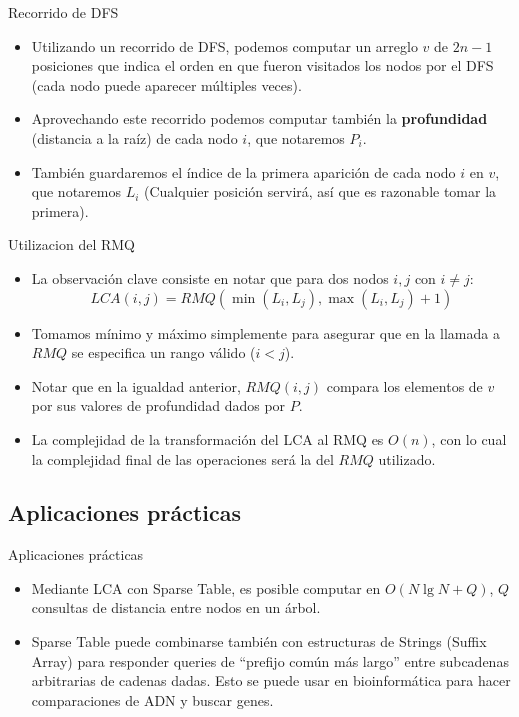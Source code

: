 \documentclass{beamer}
\DeclareMathOperator*{\mimin}{min}
\DeclareMathOperator*{\mimax}{max}
\begin{document}
\begin{frame}{Recorrido de DFS}
\begin{itemize}
   \item Utilizando un recorrido de DFS, podemos computar un arreglo $v$ de $2n - 1$ posiciones que indica el orden en que
   fueron visitados los nodos por el DFS (cada nodo puede aparecer múltiples veces).
   \item Aprovechando este recorrido podemos computar también la \textbf{profundidad} (distancia a la raíz) de cada nodo $i$, que notaremos $P_i$.
   \item También guardaremos el índice de la primera aparición de cada nodo $i$ en $v$, que notaremos $L_i$ (Cualquier posición servirá, así
   que es razonable tomar la primera).
\end{itemize}
\end{frame}

\begin{frame}{Utilizacion del RMQ}
\begin{itemize}
   \item La observación clave consiste en notar que para dos nodos $i,j$ con $i \neq j$:
   $$ LCA(i,j) = RMQ(\mimin(L_i,L_j),\mimax(L_i,L_j)+1) $$
   \item Tomamos mínimo y máximo simplemente para asegurar que en la llamada a $RMQ$ se especifica un rango válido ($i < j$).
   \item Notar que en la igualdad anterior, $RMQ(i,j)$ compara los elementos de $v$ por sus valores de profundidad dados por $P$.
   \item La complejidad de la transformación del LCA al RMQ es $O(n)$, con lo cual la complejidad final de las operaciones
   será la del $RMQ$ utilizado.
\end{itemize}
\end{frame}

\subsection{Aplicaciones prácticas} %

\begin{frame}{Aplicaciones prácticas}
\begin{itemize}
   \item Mediante LCA con Sparse Table, es posible computar en $O(N \lg N + Q)$, $Q$ consultas de distancia entre nodos en un árbol.
   \item Sparse Table puede combinarse también con estructuras de Strings (Suffix Array) para responder queries de ``prefijo común más largo'' entre
           subcadenas arbitrarias de cadenas dadas. Esto se puede usar en bioinformática para hacer comparaciones de ADN y buscar genes.
\end{itemize}
\end{frame}
\end{document}
